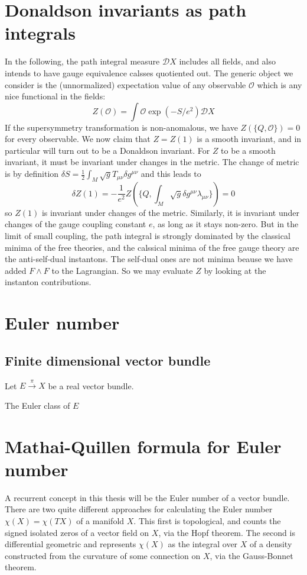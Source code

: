 \section{Donaldson invariants as path integrals}
In the following, the path integral measure $\mathcal{D}X$ includes all fields,
and also intends to have gauge equivalence calsses quotiented out. The generic
object we consider is the (unnormalized) expectation value of any observable
$\mathcal{O}$ which is any nice functional in the fields:
\[
Z(\mathcal{O}) = \int \mathcal{O} \exp(-S /e^2) \mathcal{D}X
\] 
If the supersymmetry transformation is non-anomalous, we have
$Z(\{Q,\mathcal{O}\})= 0$ for every observable. We now claim that $Z=Z(1)$ is a
smooth invariant, and in particular will turn out to be a Donaldson invariant.
For  $Z$ to be a smooth invariant, it must be invariant under changes in the
metric. The change of metric is by definition  $\delta
S=\frac{1}{2}\int_M\sqrt{g} T_{\mu\nu}\delta g^{\mu\nu}$ and this leads to
\[
	\delta Z(1) = -\frac{1}{e^2}Z(\{Q,\int_M \sqrt{g}\delta
	g^{\mu\nu}\lambda_{\mu\nu}\}) = 0
\] 
so $Z(1)$ is invariant under changes of the metric. Similarly, it is invariant
under changes of the gauge coupling constant  $e$,   as long as it stays
non-zero. But in the limit of small coupling, the path integral is strongly
dominated by the classical minima of the free theories, and the calssical minima
of the free gauge theory are the anti-self-dual instantons. The self-dual ones
are not minima beause we have added $F\wedge F$ to the Lagrangian. So we may
evaluate  $Z$ by looking at the instanton contributions. 


\section{Euler number}
\subsection{Finite dimensional vector bundle}
Let $E \xrightarrow{\pi} X$ be a real vector bundle.  

The Euler class of  $E$

\section{Mathai-Quillen formula for Euler number}
A recurrent concept in this thesis will be the Euler number of a vector bundle.
There are two quite different approaches for calculating the Euler number
$\chi(X) = \chi(TX)$ of a manifold  $X$. This first is topological, and counts
the signed isolated zeros of a vector field on $X$, via the Hopf theorem. The
second is differential geometric and represents  $\chi(X)$ as the integral over
$X$ of a density constructed from the curvature of some connection on  $X$, via
the Gauss-Bonnet theorem. 

